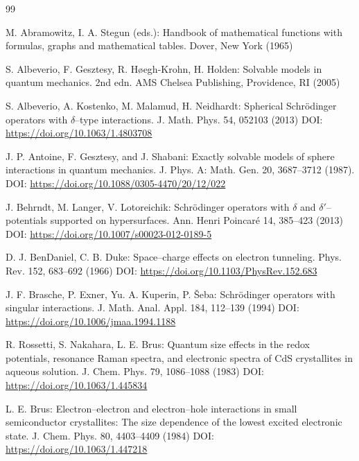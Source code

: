 \documentclass[a4paper,11pt]{article}
\numberwithin{equation}{section}
\theoremstyle{definition}
\theoremstyle{remark}
\begin{document}

\small
\begin{thebibliography}{99}

M. Abramowitz, I. A. Stegun (eds.):
Handbook of mathematical functions with formulas, graphs and
mathematical tables.
Dover, New York (1965)

S. Albeverio, F. Gesztesy, R. H{\o}egh-Krohn, H. Holden:
Solvable models in quantum mechanics. 2nd edn.
AMS Chelsea Publishing, Providence, RI (2005)

S. Albeverio, A. Kostenko, M. Malamud, H. Neidhardt:
Spherical Schr\"odinger operators with $\delta$--type interactions.
J. Math. Phys. 54, 052103 (2013)
\newline DOI: \url{https://doi.org/10.1063/1.4803708}

J. P. Antoine, F. Gesztesy, and J. Shabani:
Exactly solvable models of sphere interactions in quantum mechanics.
J. Phys. A: Math. Gen. 20, 3687--3712 (1987).
\newline DOI: \url{https://doi.org/10.1088/0305-4470/20/12/022}

J. Behrndt, M. Langer, V. Lotoreichik:
Schr\"odinger operators with $\delta$ and $\delta'$--potentials supported on hypersurfaces.
Ann. Henri Poincar\'e 14, 385--423 (2013)
\newline DOI: \url{https://doi.org/10.1007/s00023-012-0189-5}

D. J. BenDaniel, C. B. Duke:
Space--charge effects on electron tunneling.
Phys. Rev. 152, 683--692 (1966)
\newline DOI: \url{https://doi.org/10.1103/PhysRev.152.683}

J. F. Brasche, P. Exner, Yu. A. Kuperin, P. \v{S}eba:
Schr\"odinger operators with singular interactions.
J. Math. Anal. Appl. 184, 112--139 (1994)
\newline DOI: \url{https://doi.org/10.1006/jmaa.1994.1188}

R. Rossetti, S. Nakahara, L. E. Brus:
Quantum size effects in the redox potentials, resonance Raman spectra,
and electronic spectra of CdS crystallites in aqueous solution.
J. Chem. Phys. 79, 1086--1088 (1983)
\newline DOI: \url{https://doi.org/10.1063/1.445834}

L. E. Brus:
Electron--electron and electron--hole interactions in small
semiconductor crystallites: The size dependence of the lowest
excited electronic state.
J. Chem. Phys. 80, 4403--4409 (1984)
\newline DOI: \url{https://doi.org/10.1063/1.447218}


\end{thebibliography}
\end{document}
